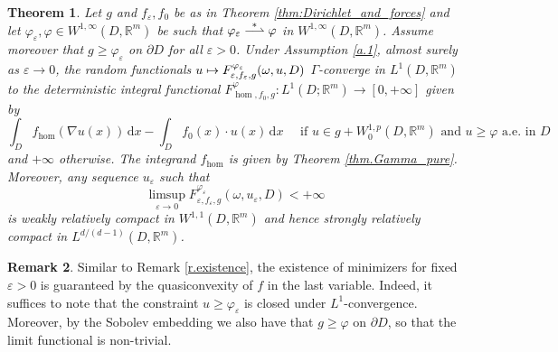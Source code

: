 \documentclass[JEP,XML,SOM,Unicode,published]{cedram}
\def\mto{\mathchoice{\longmapsto}{\mapsto}{\mapsto}{\mapsto}}
\def\harptod{\mathrel{\relbar\joinrel\rightharpoonup}}
\def\harpto{\mathchoice{\harptod}{\rightharpoonup}{\rightharpoonup}{\rightharpoonup}}
\def\harptostar{\mathchoice{\overset{\textstyle*}{\harpto}}{\overset{*}{\harptod}}{\overset{*}{\rightharpoonup}}{\overset{*}{\rightharpoonup}}}
\newtheorem{theorem}{Theorem}[section]
\theoremstyle{definition}
\newtheorem{remark}[theorem]{Remark}
\let\e\varepsilon
\let\w\omega
\newcommand{\dx}{\,\mathrm{d}x}
\newcommand{\R}{\mathbb{R}}
\begin{document}
\begin{theorem}\label{thm.obstacle}
Let $g$ and $f_{\e},f_0$ be as in Theorem \ref{thm:Dirichlet_and_forces} and let $\varphi_{\e},\varphi\in W^{1,\infty}(D,\R^m)$ be such that $\varphi_{\e}\harptostar\varphi$ in $W^{1,\infty}(D,\R^m)$. Assume moreover that $g\geq\varphi_{\e}$ on $\partial D$ for all $\e>0$. Under Assumption \ref{a.1}, almost surely as $\e\to 0$, the random functionals $u\mto F^{\varphi_{\e}}_{\e,f_{\e},g}(\w,u,D)$ $\Gamma$-converge in $L^1(D,\R^m)$ to the deterministic integral functional $F^{\varphi}_{\hom,f_0,g}:L^1(D;\R^m)\to [0,+\infty]$ given by
\begin{equation*}
\int_D f_{\hom}(\nabla u(x))\dx-\int_Df_0(x)\cdot u(x)\dx \quad\text{ if }u\in g+W^{1,p}_0(D,\R^m)\text{ and }u\geq\varphi\text{ a.e.\ in }D
\end{equation*}
and $+\infty$ otherwise. The integrand $f_{\hom}$ is given by Theorem \ref{thm.Gamma_pure}. Moreover, any sequence $u_{\e}$ such that
\begin{equation*}
\limsup_{\e\to 0}F^{\varphi_{\e}}_{\e,f_{\e},g}(\w,u_{\e},D)<+\infty
\end{equation*}
is weakly relatively compact in $W^{1,1}(D,\R^m)$ and hence strongly relatively compact in $L^{d/(d-1)}(D,\R^m)$.
\end{theorem}
\begin{remark}
Similar to Remark \ref{r.existence}, the existence of minimizers for fixed $\e>0$ is guaranteed by the quasiconvexity of $f$ in the last variable. Indeed, it suffices to note that the constraint $u\geq\varphi_{\e}$ is closed under $L^1$-convergence. Moreover, by the Sobolev embedding we also have that $g\geq \varphi$ on $\partial D$, so that the limit functional is non-trivial.
\end{remark}
\end{document}

